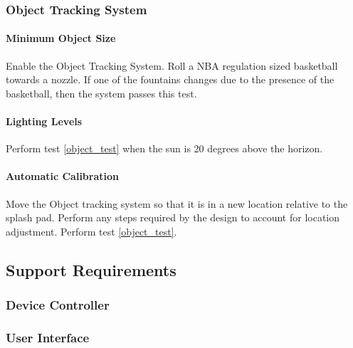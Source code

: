 \subsubsection{Object Tracking System}

\paragraph{\label{object_test}Minimum Object Size}
Enable the Object Tracking System. Roll a NBA regulation sized basketball towards a nozzle. If one of the fountains changes due to the presence of the basketball, then the system passes this test. 

\paragraph{Lighting Levels}
Perform test \ref{object_test} when the sun is 20 degrees above the horizon. 

\paragraph{Automatic Calibration}
Move the Object tracking system so that it is in a new location relative to the splash pad. Perform any steps required by the design to account for location adjustment. Perform test \ref{object_test}. 

\subsection{Support Requirements}

\subsubsection{Device Controller}

\subsubsection{User Interface}

